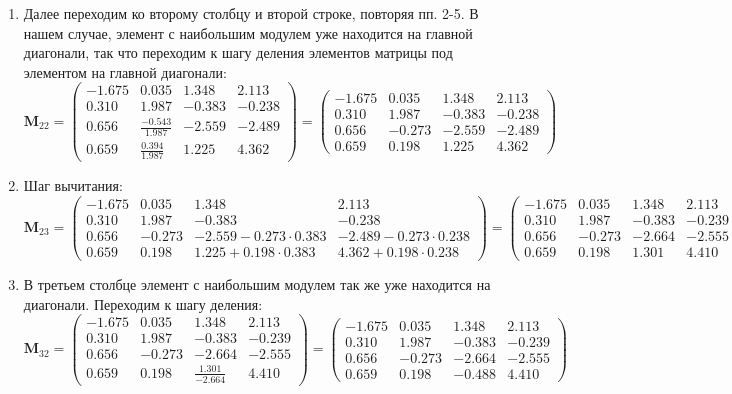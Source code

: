 \begin{enumerate}
    \item Далее переходим ко второму столбцу и второй строке, повторяя пп. 2-5. В нашем случае, элемент с наибольшим модулем уже находится на главной диагонали, так что переходим к шагу деления элементов матрицы под элементом на главной диагонали:
    \[\mathbf{M}_{22} =
    \begin{pmatrix}
       -1.675&  0.035&  1.348&  2.113\\
        0.310&  \mathbf{1.987}& -0.383& -0.238\\
        0.656& \frac{-0.543}{1.987}& -2.559& -2.489\\
        0.659&  \frac{0.394}{1.987}&  1.225&  4.362
    \end{pmatrix}=
    \begin{pmatrix}
      -1.675&          0.035 &  1.348&  2.113\\
       0.310& \mathbf{ 1.987}& -0.383& -0.238\\
       0.656& \mathit{-0.273}& -2.559& -2.489\\
       0.659& \mathit{ 0.198}&  1.225&  4.362
    \end{pmatrix}\]

    \item Шаг вычитания:
    \[\mathbf{M}_{23} =
     \begin{pmatrix}
      -1.675&          0.035 &  1.348&  2.113\\
       0.310& \mathbf{ 1.987}& \mathbf{-0.383}& \mathbf{-0.238}\\
       0.656& \mathbf{-0.273}& -2.559-0.273\cdot0.383& -2.489-0.273\cdot0.238\\
       0.659& \mathbf{ 0.198}&  1.225+0.198\cdot0.383&  4.362+0.198\cdot0.238
    \end{pmatrix} =
    \begin{pmatrix}
       -1.675&  0.035&   1.348&   2.113\\
        0.310&  1.987&  -0.383&  -0.239\\
        0.656& -0.273&  -2.664&  -2.555\\
        0.659&  0.198&   1.301&   4.410
    \end{pmatrix}\]

    \item В третьем столбце элемент с наибольшим модулем так же уже находится на диагонали. Переходим к шагу деления:
     \[\mathbf{M}_{32} =
     \begin{pmatrix}
      -1.675&  0.035&   1.348&   2.113\\
       0.310&  1.987&  -0.383&  -0.239\\
       0.656& -0.273&  \mathbf{-2.664}&  -2.555\\
       0.659&  0.198&  \frac{1.301}{-2.664}&   4.410
     \end{pmatrix} =
     \begin{pmatrix}
      -1.675&  0.035&   1.348&   2.113\\
       0.310&  1.987&  -0.383&  -0.239\\
       0.656& -0.273&  -2.664&  -2.555\\
       0.659&  0.198&  \mathit{-0.488}&   4.410
     \end{pmatrix}\]


\end{enumerate}
